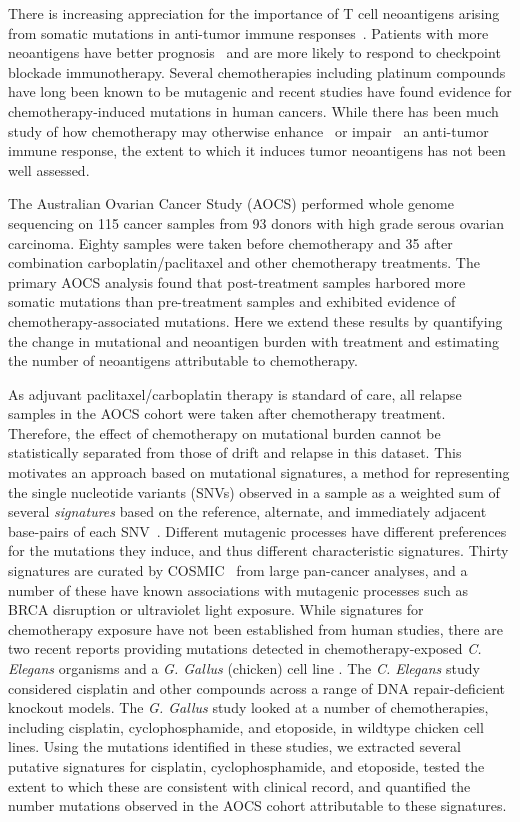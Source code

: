 There is increasing appreciation for the importance of T cell neoantigens arising from somatic mutations in anti-tumor immune responses~\cite{Schumacher_2015}. Patients with more neoantigens have better prognosis~\cite{Brown_2014} and are more likely to respond to checkpoint blockade immunotherapy\cite{Van_Allen_2015,Rizvi_2015}. Several chemotherapies including platinum compounds have long been known to be mutagenic\cite{Hannan_1989} and recent studies have found evidence for chemotherapy-induced mutations in human cancers\cite{Murugaesu_2015,Johnson_2013}. While there has been much study of how chemotherapy may otherwise enhance~\cite{Hato_2012,Machiels2001,Hodge2013} or impair~\cite{Litterman_2013} an anti-tumor immune response, the extent to which it induces tumor neoantigens has not been well assessed.

The Australian Ovarian Cancer Study (AOCS) performed whole genome sequencing on 115 cancer samples from 93 donors with high grade serous ovarian carcinoma\cite{Patch_2015}. Eighty samples were taken before chemotherapy and 35 after combination carboplatin/paclitaxel and other chemotherapy treatments. The primary AOCS analysis found that post-treatment samples harbored more somatic mutations than pre-treatment samples and exhibited evidence of chemotherapy-associated mutations. Here we extend these results by quantifying the change in mutational and neoantigen burden with treatment and estimating the number of neoantigens attributable to chemotherapy.

As adjuvant paclitaxel/carboplatin therapy is standard of care, all relapse samples in the AOCS cohort were taken after chemotherapy treatment. Therefore, the effect of chemotherapy on mutational burden cannot be statistically separated from those of drift and relapse in this dataset. This motivates an approach based on mutational signatures, a method for representing the single nucleotide variants (SNVs) observed in a sample as a weighted sum of several \textit{signatures} based on the reference, alternate, and immediately adjacent base-pairs of each SNV~\cite{Alexandrov2013}. Different mutagenic processes have different preferences for the mutations they induce, and thus different characteristic signatures. Thirty signatures are curated by COSMIC~\cite{364242} from large pan-cancer analyses, and a number of these have known associations with mutagenic processes such as BRCA disruption or ultraviolet light exposure. While signatures for chemotherapy exposure have not been established from human studies, there are two recent reports providing mutations detected in chemotherapy-exposed \textit{C. Elegans} organisms\cite{Meier_2014} and a \textit{G. Gallus} (chicken) cell line \cite{Szikriszt_2016}. The \textit{C. Elegans} study considered cisplatin and other compounds across a range of DNA repair-deficient knockout models. The \textit{G. Gallus} study looked at a number of chemotherapies, including cisplatin, cyclophosphamide, and etoposide, in wildtype chicken cell lines. Using the mutations identified in these studies, we extracted several putative signatures for cisplatin, cyclophosphamide, and etoposide, tested the extent to which these are consistent with clinical record, and quantified the number mutations observed in the AOCS cohort attributable to these signatures.
